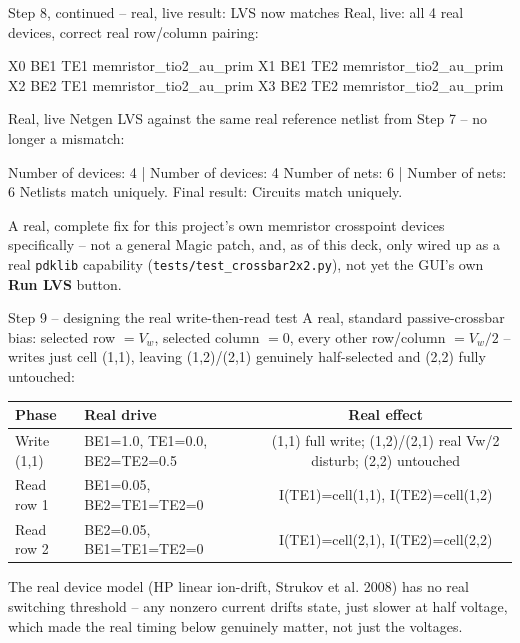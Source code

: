 \documentclass[aspectratio=169,9pt]{beamer}
\begin{document}
\begin{frame}[fragile]{Step 8, continued -- real, live result: LVS now matches}
Real, live: all 4 real devices, correct real row/column pairing:
\begin{cli}
X0 BE1 TE1 memristor_tio2_au_prim
X1 BE1 TE2 memristor_tio2_au_prim
X2 BE2 TE1 memristor_tio2_au_prim
X3 BE2 TE2 memristor_tio2_au_prim
\end{cli}
Real, live Netgen LVS against the same real reference netlist from
Step 7 -- no longer a mismatch:
\begin{cli}
Number of devices: 4                | Number of devices: 4
Number of nets: 6                   | Number of nets: 6
Netlists match uniquely.
Final result: Circuits match uniquely.
\end{cli}
\footnotesize
A real, complete fix for this project's own memristor crosspoint
devices specifically -- not a general Magic patch, and, as of this
deck, only wired up as a real \texttt{pdklib} capability
(\texttt{tests/test\_crossbar2x2.py}), not yet the GUI's own
\textbf{Run LVS} button.
\end{frame}

\begin{frame}[fragile]{Step 9 -- designing the real write-then-read test}
A real, standard passive-crossbar bias: selected row $=V_w$, selected
column $=0$, every other row/column $=V_w/2$ -- writes just cell
(1,1), leaving (1,2)/(2,1) genuinely half-selected and (2,2) fully
untouched:
\begin{center}
\begin{tabularx}{\textwidth}{lXc}
\toprule
Phase & Real drive & Real effect \\
\midrule
Write (1,1) & BE1=1.0, TE1=0.0, BE2=TE2=0.5 & (1,1) full write; (1,2)/(2,1) real Vw/2 disturb; (2,2) untouched \\
Read row 1 & BE1=0.05, BE2=TE1=TE2=0 & I(TE1)=cell(1,1), I(TE2)=cell(1,2) \\
Read row 2 & BE2=0.05, BE1=TE1=TE2=0 & I(TE1)=cell(2,1), I(TE2)=cell(2,2) \\
\bottomrule
\end{tabularx}
\end{center}
\footnotesize
The real device model (HP linear ion-drift, Strukov et al. 2008) has
no real switching threshold -- any nonzero current drifts state, just
slower at half voltage, which made the real timing below genuinely
matter, not just the voltages.
\end{frame}
\end{document}
